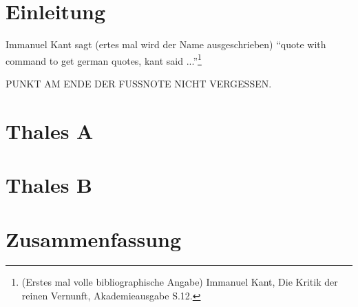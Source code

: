 \section{Einleitung}

Immanuel Kant sagt (ertes mal wird der Name ausgeschrieben) \enquote{quote with command to get german quotes, kant said ...}\footnote{ (Erstes mal volle bibliographische Angabe) Immanuel Kant, Die Kritik der reinen Vernunft, Akademieausgabe  S.12.} 

PUNKT AM ENDE DER FUSSNOTE NICHT VERGESSEN.

\section{Thales A}

\section{Thales B}

\section{Zusammenfassung}